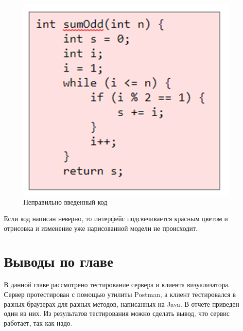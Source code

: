 \begin{figure}[h]
	\center
	\includegraphics [scale=0.5] {my_folder/images/my/27}
	\caption{Неправильно введенный код}
	\label{fig:27}
\end{figure}

Если код написан неверно, то интерфейс подсвечивается красным цветом и отрисовка и изменение уже нарисованной модели не происходит.\newpage
\section{Выводы по главе} \label{ch6:sec3}
В данной главе рассмотрено тестирование сервера и клиента визуализатора. Сервер протестирован с помощью утилиты Postman, а клиент тестировался в разных браузерах для разных методов, написанных на Java. В отчете приведен один из них. Из результатов тестирования можно сделать вывод, что сервис работает, так как надо.
\newpage